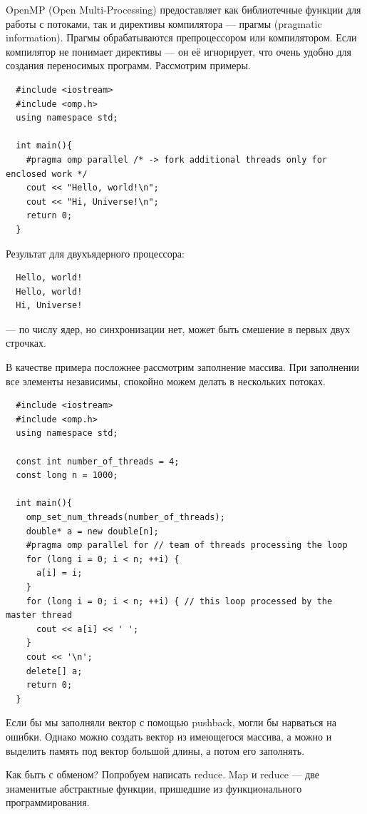 \documentclass{book}
\begin{document}
OpenMP (Open Multi-Processing) предоставляет как библиотечные функции для работы
с потоками, так и директивы компилятора --- прагмы (pragmatic information).
Прагмы обрабатываются препроцессором или компилятором. Если компилятор не
понимает директивы --- он её игнорирует, что очень удобно для создания
переносимых программ. Рассмотрим примеры.

\begin{verbatim}
  #include <iostream>
  #include <omp.h>
  using namespace std;

  int main(){
    #pragma omp parallel /* -> fork additional threads only for enclosed work */
    cout << "Hello, world!\n";
    cout << "Hi, Universe!\n";
    return 0;
  }
\end{verbatim}
Результат для двухъядерного процессора:
\begin{verbatim}
  Hello, world!
  Hello, world!
  Hi, Universe!
\end{verbatim}
--- по числу ядер, но синхронизации нет, может быть смешение в первых двух
строчках.

В качестве примера посложнее рассмотрим заполнение массива. При заполнении все
элементы независимы, спокойно можем делать в нескольких потоках.

\begin{verbatim}
  #include <iostream>
  #include <omp.h>
  using namespace std;

  const int number_of_threads = 4;
  const long n = 1000;

  int main(){
    omp_set_num_threads(number_of_threads);
    double* a = new double[n];
    #pragma omp parallel for // team of threads processing the loop
    for (long i = 0; i < n; ++i) {
      a[i] = i;
    }
    for (long i = 0; i < n; ++i) { // this loop processed by the master thread
      cout << a[i] << ' ';
    }
    cout << '\n';
    delete[] a;
    return 0;
  }
\end{verbatim}

Если бы мы заполняли вектор с помощью pushback, могли бы нарваться на ошибки.
Однако можно создать вектор из имеющегося массива, а можно и выделить память под
вектор большой длины, а потом его заполнять.

Как быть с обменом? Попробуем написать reduce. Map и reduce --- две
знаменитые абстрактные функции, пришедшие из функционального программирования.
\end{document}
